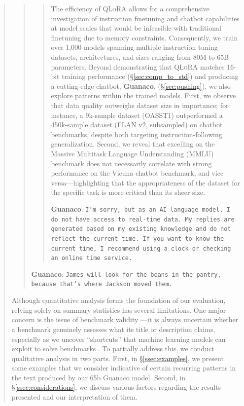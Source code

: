 \begin{quote}
\begin{quote}
\begin{quote}
The efficiency of \textsc{QLoRA} allows for a comprehensive investigation of instruction finetuning and chatbot capabilities at model scales that would be infeasible with traditional finetuning due to memory constraints. Consequently, we train over 1,000 models spanning multiple instruction tuning datasets, architectures, and sizes ranging from 80M to 65B parameters. Beyond demonstrating that \textsc{QLoRA} matches 16-bit training performance (\S\ref{sec:comp_to_std}) and producing a cutting-edge chatbot, \textbf{Guanaco}, (\S\ref{sec:pushing}), we also explore patterns within the trained models. First, we observe that data quality outweighs dataset size in importance; for instance, a 9k-sample dataset (OASST1) outperformed a 450k-sample dataset (FLAN v2, subsampled) on chatbot benchmarks, despite both targeting instruction-following generalization. Second, we reveal that excelling on the Massive Multitask Language Understanding (MMLU) benchmark does not necessarily correlate with strong performance on the Vicuna chatbot benchmark, and vice versa—highlighting that the appropriateness of the dataset for the specific task is more critical than its sheer size.

    \textbf{Guanaco}: \texttt{I’m sorry, but as an AI language model, I do not have access to real-time data. My replies are generated based on my existing knowledge and do not reflect the current time. If you want to know the current time, I recommend using a clock or checking an online time service.}
\end{quote}

    \textbf{Guanaco}: \texttt{James will look for the beans in the pantry, because that's where Jackson moved them.}
\end{quote}

Although quantitative analysis forms the foundation of our evaluation, relying solely on summary statistics has several limitations. One major concern is the issue of benchmark validity \citep{liao2021we}—it is always uncertain whether a benchmark genuinely assesses what its title or description claims, especially as we uncover “shortcuts” that machine learning models can exploit to solve benchmarks \citep{gururangan2018annotation, poliak2018hypothesis}. To partially address this, we conduct qualitative analysis in two parts. First, in \S\ref{ssec:examples}, we present some examples that we consider indicative of certain recurring patterns in the text produced by our 65b {Guanaco} model. Second, in \S\ref{ssec:considerations}, we discuss various factors regarding the results presented and our interpretation of them.


\end{quote}
